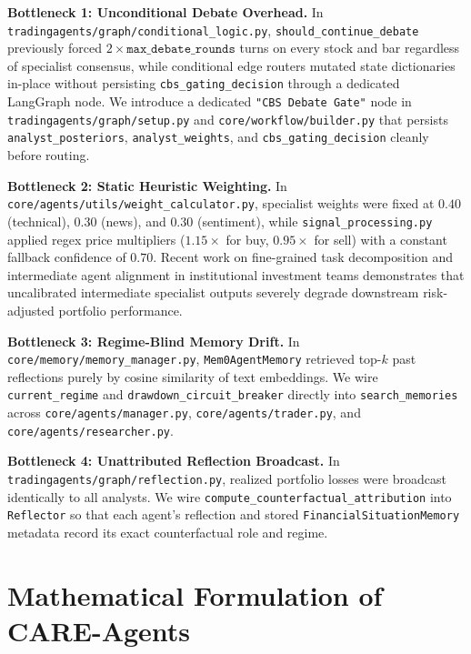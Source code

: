 \documentclass[10pt,a4paper,twocolumn]{article}
\begin{document}
\noindent\textbf{Bottleneck 1: Unconditional Debate Overhead.} In \texttt{tradingagents/graph/conditional\_logic.py}, \texttt{should\_continue\_debate} previously forced $2 \times \texttt{max\_debate\_rounds}$ turns on every stock and bar regardless of specialist consensus, while conditional edge routers mutated state dictionaries in-place without persisting \texttt{cbs\_gating\_decision} through a dedicated LangGraph node. We introduce a dedicated \texttt{"CBS Debate Gate"} node in \texttt{tradingagents/graph/setup.py} and \texttt{core/workflow/builder.py} that persists \texttt{analyst\_posteriors}, \texttt{analyst\_weights}, and \texttt{cbs\_gating\_decision} cleanly before routing.

\noindent\textbf{Bottleneck 2: Static Heuristic Weighting.} In \texttt{core/agents/utils/weight\_calculator.py}, specialist weights were fixed at $0.40$ (technical), $0.30$ (news), and $0.30$ (sentiment), while \texttt{signal\_processing.py} applied regex price multipliers ($1.15\times$ for buy, $0.95\times$ for sell) with a constant fallback confidence of $0.70$. Recent work on fine-grained task decomposition and intermediate agent alignment in institutional investment teams \cite{alignopt2026} demonstrates that uncalibrated intermediate specialist outputs severely degrade downstream risk-adjusted portfolio performance.

\noindent\textbf{Bottleneck 3: Regime-Blind Memory Drift.} In \texttt{core/memory/memory\_manager.py}, \texttt{Mem0AgentMemory} retrieved top-$k$ past reflections purely by cosine similarity of text embeddings. We wire \texttt{current\_regime} and \texttt{drawdown\_circuit\_breaker} directly into \texttt{search\_memories} across \texttt{core/agents/manager.py}, \texttt{core/agents/trader.py}, and \texttt{core/agents/researcher.py}.

\noindent\textbf{Bottleneck 4: Unattributed Reflection Broadcast.} In \texttt{tradingagents/graph/reflection.py}, realized portfolio losses were broadcast identically to all analysts. We wire \texttt{compute\_counterfactual\_attribution} into \texttt{Reflector} so that each agent's reflection and stored \texttt{FinancialSituationMemory} metadata record its exact counterfactual role and regime.

\section{Mathematical Formulation of CARE-Agents}
\end{document}
